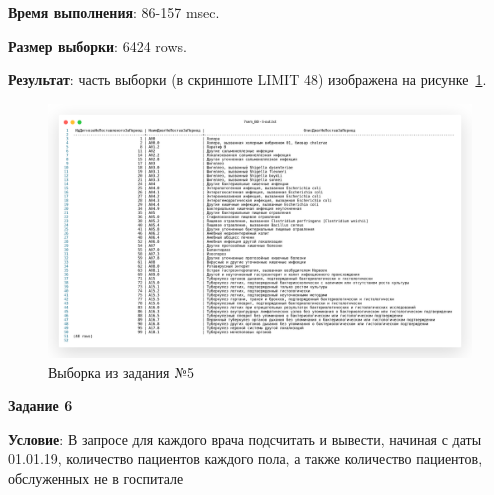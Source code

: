 


\textbf{Время выполнения}: 86-157 msec.

\textbf{Размер выборки}: 6424 rows.

\textbf{Результат}: часть выборки (в скриншоте LIMIT 48) изображена на рисунке~\ref{fig:t5}.

\begin{figure}[!h]
  \centering

  \includegraphics[width=18cm]
  {../sql/task5/5-out.png}

  \caption{Выборка из задания №5}

  \label{fig:t5}
\end{figure}


\begin{center}
  \textbf{Задание 6}
\end{center}
  
\textbf{Условие}:
В запросе для каждого врача подсчитать и вывести, начиная с даты 01.01.19, количество
пациентов каждого пола, а также количество пациентов, обслуженных не в госпитале
  






